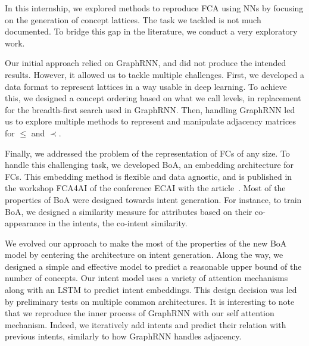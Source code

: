 
In this internship, we explored methods to reproduce FCA using NNs by focusing on the generation of concept lattices.
The task we tackled is not much documented. To bridge this gap in the literature, we conduct a very exploratory work.

Our initial approach relied on GraphRNN, and did not produce the intended results.
However, it allowed us to tackle multiple challenges.
First, we developed a data format to represent lattices in a way usable in deep learning.
To achieve this, we designed a concept ordering based on what we call levels, in replacement for the breadth-first search used in GraphRNN. %
Then, handling GraphRNN led us to explore multiple methods to represent and manipulate adjacency matrices for $\leq$ and $\prec$.

Finally, we addressed the problem of the representation of FCs of any size.
%
To handle this challenging task, we developed BoA, an embedding architecture for FCs.
This embedding method is flexible and data agnostic, and is published in the workshop FCA4AI of the conference ECAI with the article~\cite{boa:2020:marquer}.
Most of the properties of BoA were designed towards intent generation.
For instance, to train BoA, we designed a similarity measure for attributes based on their co-appearance in the intents, the co-intent similarity. %

We evolved our approach to make the most of the properties of the new BoA model by centering the architecture on intent generation.
Along the way, we designed a simple and effective model to predict a reasonable upper bound of the number of concepts.
Our intent model uses a variety of attention mechanisms along with an LSTM to predict intent embeddings.
This design decision was led by preliminary tests on multiple common architectures.
It is interesting to note that we reproduce the inner process of GraphRNN with our self attention mechanism.
Indeed, we iteratively add intents and predict their relation with previous intents, similarly to how GraphRNN handles adjacency.

